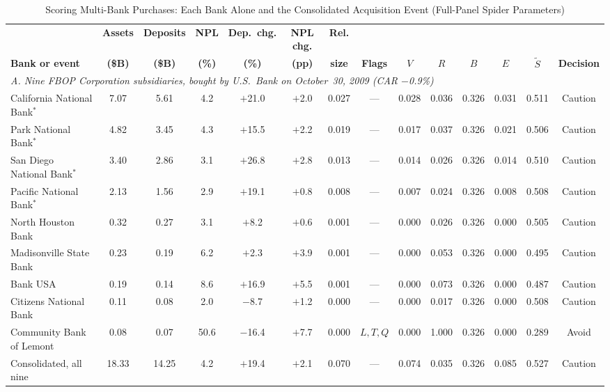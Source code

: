 \begin{table}[!t]
\caption{Scoring Multi-Bank Purchases: Each Bank Alone and the Consolidated Acquisition Event (Full-Panel Spider Parameters)}
\label{tab:events}
\centering
\footnotesize
\setlength{\tabcolsep}{2pt}
\begin{tabular*}{\textwidth}{@{\extracolsep{\fill}}lccccccccccccc}
\toprule
 & \textbf{Assets} & \textbf{Deposits} & \textbf{NPL} & \textbf{Dep.\ chg.} & \textbf{NPL chg.} & \textbf{Rel.} & & & & & & & \\
\textbf{Bank or event} & \textbf{(\$B)} & \textbf{(\$B)} & \textbf{(\%)} & \textbf{(\%)} & \textbf{(pp)} & \textbf{size} & \textbf{Flags} &
$V$ & $R$ & $B$ & $E$ & $\tilde S$ & \textbf{Decision} \\
\midrule
\multicolumn{14}{l}{\textit{A. Nine FBOP Corporation subsidiaries, bought by U.S.~Bank on October~30, 2009 (CAR $-$0.9\%)}} \\
California National Bank$^{*}$ & 7.07 & 5.61 & 4.2 & $+$21.0 & $+$2.0 & 0.027 & --- & 0.028 & 0.036 & 0.326 & 0.031 & 0.511 & Caution \\
Park National Bank$^{*}$ & 4.82 & 3.45 & 4.3 & $+$15.5 & $+$2.2 & 0.019 & --- & 0.017 & 0.037 & 0.326 & 0.021 & 0.506 & Caution \\
San Diego National Bank$^{*}$ & 3.40 & 2.86 & 3.1 & $+$26.8 & $+$2.8 & 0.013 & --- & 0.014 & 0.026 & 0.326 & 0.014 & 0.510 & Caution \\
Pacific National Bank$^{*}$ & 2.13 & 1.56 & 2.9 & $+$19.1 & $+$0.8 & 0.008 & --- & 0.007 & 0.024 & 0.326 & 0.008 & 0.508 & Caution \\
North Houston Bank & 0.32 & 0.27 & 3.1 & $+$8.2 & $+$0.6 & 0.001 & --- & 0.000 & 0.026 & 0.326 & 0.000 & 0.505 & Caution \\
Madisonville State Bank & 0.23 & 0.19 & 6.2 & $+$2.3 & $+$3.9 & 0.001 & --- & 0.000 & 0.053 & 0.326 & 0.000 & 0.495 & Caution \\
Bank USA & 0.19 & 0.14 & 8.6 & $+$16.9 & $+$5.5 & 0.001 & --- & 0.000 & 0.073 & 0.326 & 0.000 & 0.487 & Caution \\
Citizens National Bank & 0.11 & 0.08 & 2.0 & $-$8.7 & $+$1.2 & 0.000 & --- & 0.000 & 0.017 & 0.326 & 0.000 & 0.508 & Caution \\
Community Bank of Lemont & 0.08 & 0.07 & 50.6 & $-$16.4 & $+$7.7 & 0.000 & $L,T,Q$ & 0.000 & 1.000 & 0.326 & 0.000 & 0.289 & Avoid \\
Consolidated, all nine & 18.33 & 14.25 & 4.2 & $+$19.4 & $+$2.1 & 0.070 & --- & 0.074 & 0.035 & 0.326 & 0.085 & 0.527 & Caution \\

\end{tabular*}
\end{table}
